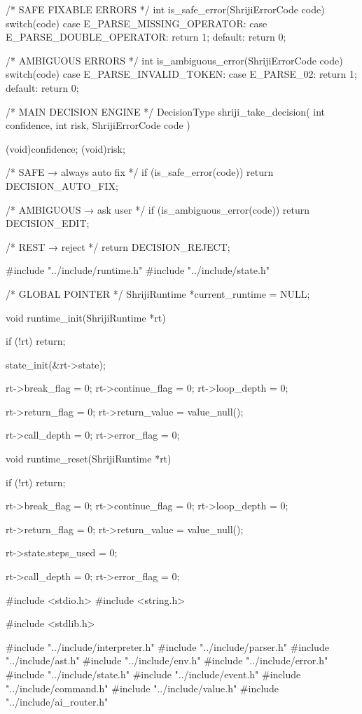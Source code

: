 \documentclass{article}
\begin{document}
/* SAFE FIXABLE ERRORS */
int is_safe_error(ShrijiErrorCode code)
{
    switch(code)
    {
        case E_PARSE_MISSING_OPERATOR:
        case E_PARSE_DOUBLE_OPERATOR:
            return 1;
        default:
            return 0;
    }
}

/* AMBIGUOUS ERRORS */
int is_ambiguous_error(ShrijiErrorCode code)
{
    switch(code)
    {
        case E_PARSE_INVALID_TOKEN:
        case E_PARSE_02:
            return 1;
        default:
            return 0;
    }
}

/* MAIN DECISION ENGINE */
DecisionType shriji_take_decision(
    int confidence,
    int risk,
    ShrijiErrorCode code
)
{
    (void)confidence;
    (void)risk;

    /* SAFE → always auto fix */
    if (is_safe_error(code))
        return DECISION_AUTO_FIX;

    /* AMBIGUOUS → ask user */
    if (is_ambiguous_error(code))
        return DECISION_EDIT;

    /* REST → reject */
    return DECISION_REJECT;
}
#include "../include/runtime.h"
#include "../include/state.h"

/* GLOBAL POINTER */
ShrijiRuntime *current_runtime = NULL;

void runtime_init(ShrijiRuntime *rt)
{
    if (!rt) return;

    state_init(&rt->state);

    rt->break_flag = 0;
    rt->continue_flag = 0;
    rt->loop_depth = 0;

    rt->return_flag = 0;
    rt->return_value = value_null();

    rt->call_depth = 0;
    rt->error_flag = 0;
}

void runtime_reset(ShrijiRuntime *rt)
{
    if (!rt) return;

    rt->break_flag = 0;
    rt->continue_flag = 0;
    rt->loop_depth = 0;

    rt->return_flag = 0;
    rt->return_value = value_null();

    rt->state.steps_used = 0;

    rt->call_depth = 0;
    rt->error_flag = 0;
}
#include <stdio.h>
#include <string.h>

#include <stdlib.h>

#include "../include/interpreter.h"
#include "../include/parser.h"
#include "../include/ast.h"
#include "../include/env.h"
#include "../include/error.h"
#include "../include/state.h"
#include "../include/event.h"
#include "../include/command.h"
#include "../include/value.h"
#include "../include/ai_router.h"
\end{document}
